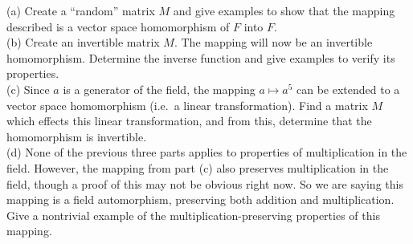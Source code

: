 %
(a) Create a ``random'' matrix $M$ and give examples to show that the mapping described is a vector space homomorphism of $F$ into $F$.\\
%
(b) Create an invertible matrix $M$.  The mapping will now be an invertible homomorphism.  Determine the inverse function and give examples to verify its properties.\\
%
(c)   Since $a$ is a generator of the field, the mapping $a\mapsto a^5$ can be extended to a vector space homomorphism (i.e.\ a linear transformation). Find a matrix $M$ which effects this linear transformation, and from this, determine that the homomorphism is invertible.\\
%
(d)  None of the previous three parts applies to properties of multiplication in the field.  However, the mapping from part (c) also preserves multiplication in the field, though a proof of this may not be obvious right now.  So we are saying this mapping is a field automorphism, preserving both addition and multiplication.  Give a nontrivial example of the multiplication-preserving properties of this mapping.
\begin{sageverbatim}\end{sageverbatim}
%
